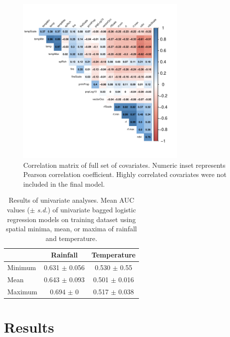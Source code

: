 \documentclass{article}
\begin{document}
\begin{figure}
\centering
\includegraphics[width=0.75\textwidth]{correlationMatrix}
\caption{Correlation matrix of full set of covariates. Numeric inset represents Pearson correlation coefficient. Highly correlated covariates were not included in the final model.}
\label{fig:corrmat}
\end{figure}

\begin{table}
\normalsize
\centering
\caption{Results of univariate analyses. Mean AUC values ($\pm$ \textit{s.d.}) of univariate bagged logistic regression models on training dataset using spatial minima, mean, or maxima of rainfall and temperature.}
\label{table:univarateAnalyses}
\begin{tabular}{lcc}
          & Rainfall                     & Temperature                   \\ \hline
Minimum   & 0.631 $\pm$ 0.056              & 0.530 $\pm$ 0.55                          \\
Mean      & 0.643 $\pm$ 0.093              & 0.501 $\pm$ 0.016                         \\
Maximum   & 0.694 $\pm$ 0                  & 0.517 $\pm$ 0.038
\end{tabular}
\begin{flushleft}
\smallskip

\end{flushleft}
\end{table}

\section{Results}
\end{document}
